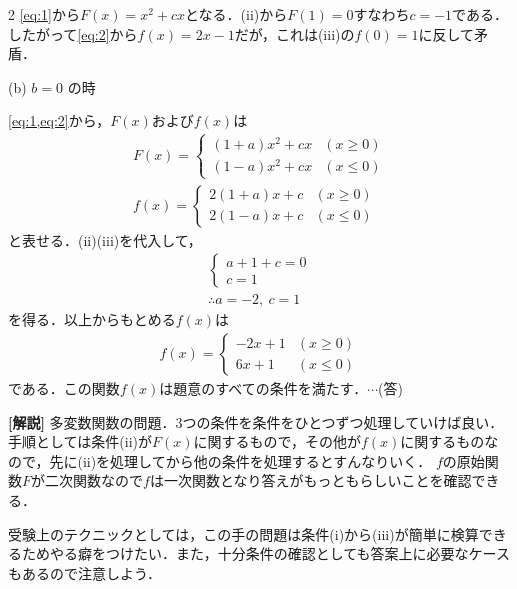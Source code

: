 \documentclass[../../main.tex]{subfiles}
\begin{document}
\begin{multicols}{2}
  \cref{eq:1}から$F(x)=x^2 + cx$となる．(ii)から$F(1)=0$すなわち$c=-1$である．
  したがって\cref{eq:2}から$f(x)=2x-1$だが，これは(iii)の$f(0)=1$に反して矛盾．

  (b) $b=0$ の時

  \cref{eq:1,eq:2}から，$F(x)$および$f(x)$は
  \begin{align}
    F(x) =
    \begin{cases}
      (1+a)x^2 + cx & (x \ge 0) \\
      (1-a)x^2 + cx & (x \le 0)
    \end{cases} \\
    f(x) =
    \begin{cases}
      2(1+a)x + c & (x \ge 0) \\
      2(1-a)x + c & (x \le 0)
    \end{cases}
  \end{align}
  と表せる．(ii)(iii)を代入して，
  \begin{align}
    \begin{cases}
      a+1+c = 0 \\
      c=1
    \end{cases} \\
    \therefore a = -2, \ c=1
  \end{align}
  を得る．以上からもとめる$f(x)$は
  \begin{align}
    f(x) =
    \begin{cases}
      -2x+1 & (x \ge 0) \\
      6x+1  & (x \le 0)
    \end{cases}
  \end{align}
  である．この関数$f(x)$は題意のすべての条件を満たす．$\cdots$(答)

  {\bf [解説]}
  多変数関数の問題．3つの条件を条件をひとつずつ処理していけば良い．
  手順としては条件(ii)が$F(x)$に関するもので，その他が$f(x)$に関するものなので，先に(ii)を処理してから他の条件を処理するとすんなりいく．
  $f$の原始関数$F$が二次関数なので$f$は一次関数となり答えがもっともらしいことを確認できる．

  受験上のテクニックとしては，この手の問題は条件(i)から(iii)が簡単に検算できるためやる癖をつけたい．また，十分条件の確認としても答案上に必要なケースもあるので注意しよう．

  \newpage
\end{multicols}
\end{document}
